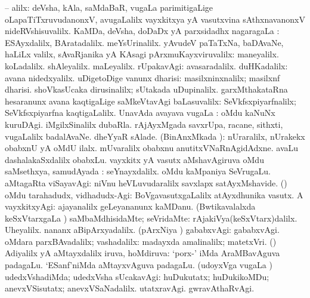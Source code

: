 \bentry
{}
\gl{\upa}
\bmng
\bnum
{} -- alilx: 
\banum
{} deVsha, kAla, saMdaBaR, \mo vugaLa parimitigaLige oLapaTiTxruvudanonxV, avugaLalilx vayxkitxya yA vasutxvina sAthxnavanonxV nideRVshisuvalilx. 
 KaMDa, deVsha, doDaDx yA parxsidadhx nagaragaLa \vi:  ESAyxdalilx,  BAratadalilx.  meYsUrinalilx. 
 yAvudeV paTaTxNa, baDAvaNe, haLiLx \mo valilx, sAvaRjanika yA KAsagi pArxmuKayxviruvalilx:  maneyalilx.  koLadalilx.  shAleyalilx.  maLeyalilx. 
 rUpakavAgi:  avasaradalilx.  duHKadalilx:  avana nidedxyalilx. 
 uDigetoDige \mo vanunx dharisi:  masilxninxnalilx; masilxnf dharisi.  shoVkasUcaka dirusinalilx; sUtakada uDupinalilx. 
 garxMthakataRna hesaranunx avana kaqtigaLige saMkeVtavAgi baLasuvalilx:  SeVkfsxpiyarfnalilx; SeVkfsxpiyarfna kaqtigaLalilx. 
 UnavAda avayava \mo vugaLa \vi:  oMdu kaNuNx kuruDAgi.  iMgilxSinalilx dubaRla.  rAjAyxMgada savxrUpa, racane, sithxti, \mo vugaLalilx badalAvaNe.  dheYyaR sAlade. 
 (BinAnxMkada \vi):  nUraralilx, nUrakekx obabxnU yA oMdU ilalx.  mUvaralilx obabxnu anutitxVNaRnAgidAdxne.  avaLu dashalakaSxdalilx obabxLu. 
 vayxkitx yA vasutx aMshavAgiruva oMdu saMsethxya, samudAyada \vi:  seYnayxdalilx.  oMdu kaMpaniya SeVrugaLu. 
 aMtagaRta viSayavAgi:  niVnu heVLuvudaralilx savxlapx satAyxMshavide. 
 (\AmA) oMdu tarahadudx, vidhadudx-Agi:  BoVgavasutxgaLalilx atAyxdhunika vasutx. 
 A vayxkitxyAgi:  ajayanalilx geLeyananunx kaMDanu. 
 (Bwtikavalalxda keSxVtarxgaLa \vi) saMbaMdhisidaMte; seVridaMte:  rAjakiVya(keSxVtarx)dalilx.  Uheyalilx.  nananx aBipArxyadalilx. 
 (pArxNiya \vi) gababxvAgi:  gababxvAgi. 
 oMdara parxBAvadalilx; vashadalilx:  madayxda amalinalilx; matetxVri. 
 (\vAyx) Adiyalilx yA aMtayxdalilx iruva, hoMdiruva:  `porx-' iMda AraMBavAguva padagaLu.  `ESanf'niMda aMtayxvAguva padagaLu. 
 (udoyxVga \mo vugaLa \vi) udedxVshadiMda; udedxVsha sUcakavAgi:  huDukutatx; huDukikoMDu; anevxVSisutatx; anevxVSaNadalilx.  utatxravAgi.  gwravAthaRvAgi. 
